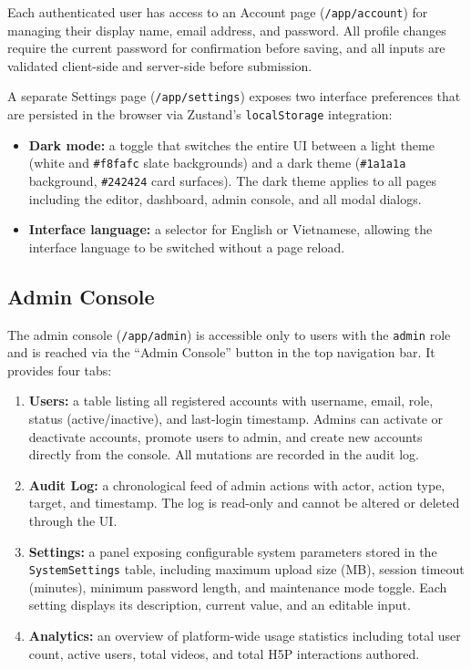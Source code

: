 Each authenticated user has access to an Account page (\texttt{/app/account})
for managing their display name, email address, and password. All profile
changes require the current password for confirmation before saving, and all
inputs are validated client-side and server-side before submission.

A separate Settings page (\texttt{/app/settings}) exposes two interface
preferences that are persisted in the browser via Zustand's
\texttt{localStorage} integration:

\begin{itemize}
  \item \textbf{Dark mode:} a toggle that switches the entire UI between a
  light theme (white and \texttt{\#f8fafc} slate backgrounds) and a dark
  theme (\texttt{\#1a1a1a} background, \texttt{\#242424} card surfaces).
  The dark theme applies to all pages including the editor, dashboard,
  admin console, and all modal dialogs.
  \item \textbf{Interface language:} a selector for English or Vietnamese,
  allowing the interface language to be switched without a page reload.
\end{itemize}

\subsection{Admin Console}

The admin console (\texttt{/app/admin}) is accessible only to users with
the \texttt{admin} role and is reached via the ``Admin Console'' button
in the top navigation bar. It provides four tabs:

\begin{enumerate}
  \item \textbf{Users:} a table listing all registered accounts with
  username, email, role, status (active/inactive), and last-login timestamp.
  Admins can activate or deactivate accounts, promote users to admin, and
  create new accounts directly from the console. All mutations are recorded
  in the audit log.

  \item \textbf{Audit Log:} a chronological feed of admin actions with
  actor, action type, target, and timestamp. The log is read-only and
  cannot be altered or deleted through the UI.

  \item \textbf{Settings:} a panel exposing configurable system parameters
  stored in the \texttt{SystemSettings} table, including maximum upload
  size (MB), session timeout (minutes), minimum password length, and
  maintenance mode toggle. Each setting displays its description,
  current value, and an editable input.

  \item \textbf{Analytics:} an overview of platform-wide usage statistics
  including total user count, active users, total videos, and total H5P
  interactions authored.
\end{enumerate}

